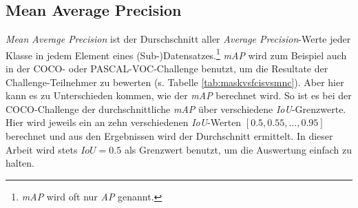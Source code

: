 \subsection{Mean Average Precision}

\textit{Mean Average Precision} ist der Durschschnitt aller \textit{Average Precision}-Werte jeder Klasse in jedem Element eines (Sub-)Datensatzes.\footnote{\textit{mAP} wird oft nur \textit{AP} genannt.} \textit{mAP} wird zum Beispiel auch in der COCO- oder PASCAL-VOC-Challenge benutzt, um die Resultate der Challenge-Teilnehmer zu bewerten (s. Tabelle \ref{tab:maskvsfcisvsmnc}). Aber hier kann es zu Unterschieden kommen, wie der \textit{mAP} berechnet wird. So ist es bei der COCO-Challenge der durchschnittliche \textit{mAP} über verschiedene \textit{IoU}-Grenzwerte. Hier wird jeweils ein  an zehn verschiedenen \textit{IoU}-Werten $[0.5, 0.55, \dots, 0.95]$ berechnet und aus den Ergebnissen wird der Durchschnitt ermittelt.\cite{ref:coco:eval} In dieser Arbeit wird stets $IoU=0.5$ als Grenzwert benutzt, um die Auswertung einfach zu halten.